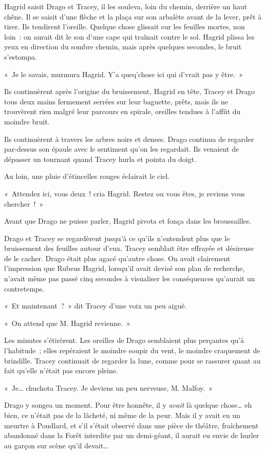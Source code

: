 Hagrid saisit Drago et Tracey, il les souleva, loin du chemin, derrière un haut chêne. Il se saisit d'une flèche et la plaça sur son arbalète avant de la lever, prêt à tirer. Ils tendirent l'oreille. Quelque chose glissait sur les feuilles mortes, non loin~: on aurait dit le son d'une cape qui traînait contre le sol. Hagrid plissa les yeux en direction du sombre chemin, mais après quelques secondes, le bruit s'estompa.

«~Je le savais, murmura Hagrid. Y'a queq'chose ici qui d'vrait pas y être.~»

Ils continuèrent après l'origine du bruissement, Hagrid en tête, Tracey et Drago tous deux mains fermement serrées sur leur baguette, prêts, mais ils ne trouvèrent rien malgré leur parcours en spirale, oreilles tendues à l'affût du moindre bruit.

Ils continuèrent à travers les arbres noirs et denses. Drago continua de regarder par-dessus son épaule avec le sentiment qu'on les regardait. Ils venaient de dépasser un tournant quand Tracey hurla et pointa du doigt.

Au loin, une pluie d'étincelles rouges éclairait le ciel.

«~Attendez ici, vous deux~! cria Hagrid. Restez ou vous êtes, je reviens vous chercher~!~»

Avant que Drago ne puisse parler, Hagrid pivota et fonça dans les broussailles.

Drago et Tracey se regardèrent jusqu'à ce qu'ils n'entendent plus que le bruissement des feuilles autour d'eux. Tracey semblait être effrayée et désireuse de le cacher. Drago était plus agacé qu'autre chose. On avait clairement l'impression que Rubeus Hagrid, lorsqu'il avait devisé son plan de recherche, n'avait même pas passé cinq secondes à visualiser les conséquences qu'aurait un contretemps.

«~Et maintenant~?~» dit Tracey d'une voix un peu aiguë.

«~On attend que M. Hagrid revienne.~»

Les minutes s'étirèrent. Les oreilles de Drago semblaient plus perçantes qu'à l'habitude~; elles repéraient le moindre soupir du vent, le moindre craquement de brindille. Tracey continuait de regarder la lune, comme pour se rassurer quant au fait qu'elle n'était pas encore pleine.

«~Je… chuchota Tracey. Je deviens un peu nerveuse, M. Malfoy.~»

Drago y songea un moment. Pour être honnête, il y \emph{avait} là quelque chose… eh bien, ce n'était pas de la lâcheté, ni même de la peur. Mais il y avait eu un meurtre à Poudlard, et s'il s'était observé dans une pièce de théâtre, fraîchement abandonné dans la Forêt interdite par un demi-géant, il aurait eu envie de hurler au garçon sur scène qu'il devait…

